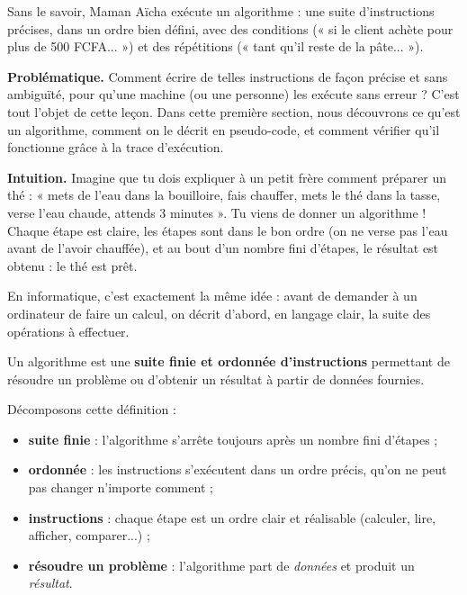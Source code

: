 \documentclass[11pt]{article}
\newcommand{\cle}[1]{{\popxbold\color{popdark}#1}}
\newcounter{popsec}
\newcounter{popsub}
\newcommand{\courssub}[1]{%
  \stepcounter{popsub}%
  \par\vspace{9pt}\noindent{\popxbold\fontsize{11.5}{13}\selectfont\color{popink}{\color{poporange}\thepopsec.\thepopsub}\hspace{6pt}#1}\par\nopagebreak\vspace{4pt}
}
\begin{document}
Sans le savoir, Maman Aïcha exécute un \cle{algorithme} : une suite d'instructions précises, dans un ordre bien défini, avec des conditions (« si le client achète pour plus de 500 FCFA... ») et des répétitions (« tant qu'il reste de la pâte... »).

\textbf{Problématique.} Comment écrire de telles instructions de façon précise et sans ambiguïté, pour qu'une machine (ou une personne) les exécute sans erreur ? C'est tout l'objet de cette leçon. Dans cette première section, nous découvrons ce qu'est un algorithme, comment on le décrit en \cle{pseudo-code}, et comment vérifier qu'il fonctionne grâce à la \cle{trace d'exécution}.

\courssub{Qu'est-ce qu'un algorithme ?}

\textbf{Intuition.} Imagine que tu dois expliquer à un petit frère comment préparer un thé : « mets de l'eau dans la bouilloire, fais chauffer, mets le thé dans la tasse, verse l'eau chaude, attends 3 minutes ». Tu viens de donner un algorithme ! Chaque étape est claire, les étapes sont dans le bon ordre (on ne verse pas l'eau avant de l'avoir chauffée), et au bout d'un nombre fini d'étapes, le résultat est obtenu : le thé est prêt.

En informatique, c'est exactement la même idée : avant de demander à un ordinateur de faire un calcul, on décrit d'abord, en langage clair, la suite des opérations à effectuer.

\begin{definition}[Algorithme]
Un \cle{algorithme} est une \textbf{suite finie et ordonnée d'instructions} permettant de résoudre un problème ou d'obtenir un résultat à partir de données fournies.
\end{definition}

Décomposons cette définition :
\begin{itemize}
  \item \textbf{suite finie} : l'algorithme s'arrête toujours après un nombre fini d'étapes ;
  \item \textbf{ordonnée} : les instructions s'exécutent dans un ordre précis, qu'on ne peut pas changer n'importe comment ;
  \item \textbf{instructions} : chaque étape est un ordre clair et réalisable (calculer, lire, afficher, comparer...) ;
  \item \textbf{résoudre un problème} : l'algorithme part de \emph{données} et produit un \emph{résultat}.
\end{itemize}
\end{document}
